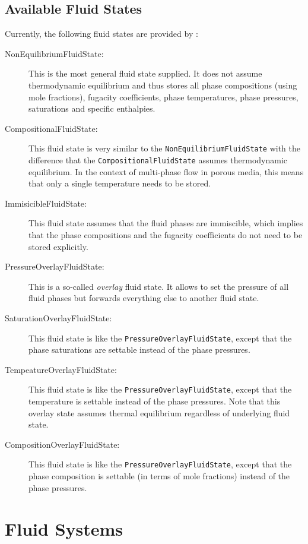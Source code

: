 \subsection{Available Fluid States}
Currently, the following fluid states are provided by \Dumux:
\begin{description}
\item[NonEquilibriumFluidState:] This is the most general fluid state
  supplied. It does not assume thermodynamic equilibrium and thus
  stores all phase compositions (using mole fractions), fugacity
  coefficients, phase temperatures, phase pressures, saturations and
  specific enthalpies.
\item[CompositionalFluidState:] This fluid state is very similar to
  the \texttt{Non\-Equilibrium\-Fluid\-State} with the difference that
  the \texttt{Compositional\-Fluid\-State} assumes thermodynamic
  equilibrium. In the context of multi-phase flow in porous media,
  this means that only a single temperature needs to be stored.
\item[ImmisicibleFluidState:] This fluid state assumes that the fluid
  phases are immiscible, which implies that the phase compositions and
  the fugacity coefficients do not need to be stored explicitly.
\item[PressureOverlayFluidState:] This is a so-called {\em overlay}
  fluid state. It allows to set the pressure of all fluid phases but
  forwards everything else to another fluid state.
\item[SaturationOverlayFluidState:] This fluid state is like the
  \texttt{PressureOverlayFluidState}, except that the phase
  saturations are settable instead of the phase pressures.
\item[TempeatureOverlayFluidState:] This fluid state is like the
  \texttt{PressureOverlayFluidState}, except that the temperature is
  settable instead of the phase pressures. Note that this overlay
  state assumes thermal equilibrium regardless of underlying fluid
  state.
\item[CompositionOverlayFluidState:] This fluid state is like the
  \texttt{PressureOverlayFluidState}, except that the phase
  composition is settable (in terms of mole fractions) instead of the
  phase pressures.
\end{description}

\section{Fluid Systems}

